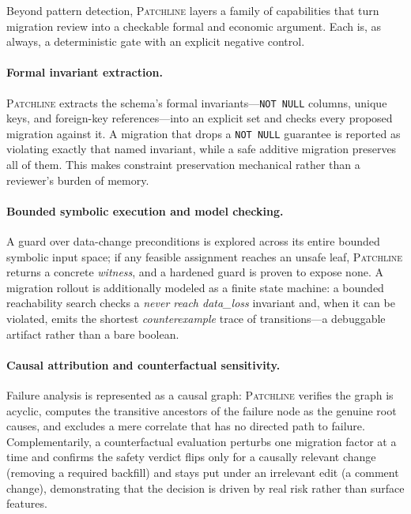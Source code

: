 \documentclass[11pt]{article}
\newcommand{\tool}{\textsc{Patchline}}
\newcommand{\code}[1]{\texttt{#1}}
\begin{document}
Beyond pattern detection, \tool{} layers a family of capabilities that turn migration review into a
checkable formal and economic argument. Each is, as always, a deterministic gate with an explicit
negative control.

\paragraph{Formal invariant extraction.} \tool{} extracts the schema's formal invariants---\code{NOT
NULL} columns, unique keys, and foreign-key references---into an explicit set and checks every
proposed migration against it. A migration that drops a \code{NOT NULL} guarantee is reported as
violating exactly that named invariant, while a safe additive migration preserves all of them. This
makes constraint preservation mechanical rather than a reviewer's burden of memory.

\paragraph{Bounded symbolic execution and model checking.} A guard over data-change preconditions is
explored across its entire bounded symbolic input space; if any feasible assignment reaches an unsafe
leaf, \tool{} returns a concrete \emph{witness}, and a hardened guard is proven to expose none. A
migration rollout is additionally modeled as a finite state machine: a bounded reachability search
checks a \emph{never reach data\_loss} invariant and, when it can be violated, emits the shortest
\emph{counterexample} trace of transitions---a debuggable artifact rather than a bare boolean.

\paragraph{Causal attribution and counterfactual sensitivity.} Failure analysis is represented as a
causal graph: \tool{} verifies the graph is acyclic, computes the transitive ancestors of the failure
node as the genuine root causes, and excludes a mere correlate that has no directed path to failure.
Complementarily, a counterfactual evaluation perturbs one migration factor at a time and confirms the
safety verdict flips only for a causally relevant change (removing a required backfill) and stays put
under an irrelevant edit (a comment change), demonstrating that the decision is driven by real risk
rather than surface features.
\end{document}
